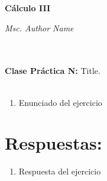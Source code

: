 \documentclass{article}
\begin{document}
\begin{minipage}{7cm}
	{\bf\Large Cálculo III}
\end{minipage}
\begin{minipage}{10cm}
	\begin{flushright}
		{\it Msc. Author Name}
	\end{flushright}
\end{minipage} \\ \\
{\bf Clase Práctica N:} Title. \\ \\
\begin{enumerate}

	\item Enunciado del ejercicio

\end{enumerate}
 
\newpage
\section*{Respuestas:}
\begin{enumerate}

\item Respuesta del ejercicio
\end{enumerate}
\end{document}
